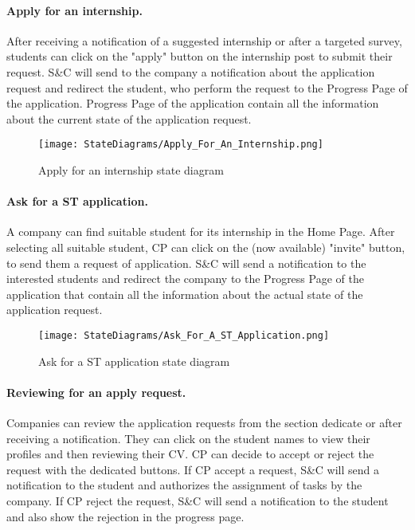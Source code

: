 \paragraph{Apply for an internship.}
After receiving a notification of a suggested internship or after a targeted survey, students can click on the "apply" button on the internship post to submit their request.
S\&C will send to the company a notification about the application request and redirect the student, who perform the request to the Progress Page of the application.
Progress Page of the application contain all the information about the current state of the application request.

\begin{figure}[H]
    \begin{center}
        \texttt{[image: StateDiagrams/Apply\_For\_An\_Internship.png]}
        \caption{Apply for an internship state diagram}
        \label{fig:apply_for_an_internship_sd}%
    \end{center}
\end{figure}

\paragraph{Ask for a ST application.}
A company can find suitable student for its internship in the Home Page. After selecting all suitable student, CP can click on the (now available) "invite" button, to send them a request of application.
S\&C will send a notification to the interested students and redirect the company to the Progress Page of the application that contain all the information about the actual state of the application request.

\begin{figure}[H]
    \begin{center}
        \texttt{[image: StateDiagrams/Ask\_For\_A\_ST\_Application.png]}
        \caption{Ask for a ST application state diagram}
        \label{fig:ask_for_a_ST_application_sd}%
    \end{center}
\end{figure}

\paragraph{Reviewing for an apply request.}
Companies can review the application requests from the section dedicate or after receiving a notification. They can click on the student names to view their profiles and then reviewing their CV.
CP can decide to accept or reject the request with the dedicated buttons. 
If CP accept a request, S\&C will send a notification to the student and authorizes the assignment of tasks by the company.
If CP reject the request, S\&C will send a notification to the student and also show the rejection in the progress page.

